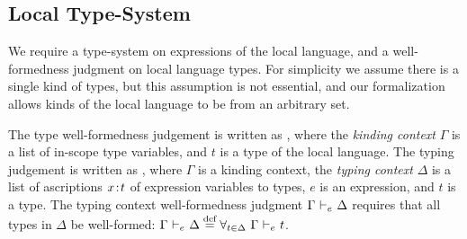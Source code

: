 \subsection{Local Type-System}
\label{sec:local-types}
We require a type-system on expressions of the local language, and a well-formedness judgment on local language types.
For simplicity we assume there is a single kind of types, but this assumption is not essential, and our formalization allows kinds of the local language to be from an arbitrary set.

The type well-formedness judgement is written as , where the \emph{kinding context} $\Gamma$ is a list of in-scope type variables, and $t$ is a type of the local language.
The typing judgement is written as , where $\Gamma$ is a kinding context, the \emph{typing context} $\Delta$ is a list of ascriptions $x \mkern2mu{:}\mkern2mu t$ of expression variables to types, $e$ is an expression, and $t$ is a type.
The typing context well-formedness judgment $\Gamma ~{\vdash}_{\footnotesize{e}}~ \Delta$ requires that all types in $\Delta$ be well-formed: $\Gamma ~{\vdash}_{\footnotesize{e}}~ \Delta \stackrel{\text{def}}{=} \forall_{t \in \Delta}~\Gamma ~{\vdash}_{\footnotesize{e}}~ t$.


